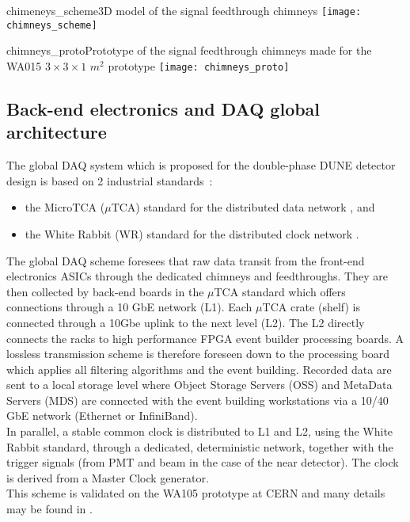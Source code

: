 \begin{cdrfigure}{chimeneys_scheme}{3D model of the signal feedthrough chimneys}
\texttt{[image: chimneys\_scheme]}
\end{cdrfigure}


\begin{cdrfigure}{chimneys_proto}{Prototype of the signal feedthrough chimneys made for the WA015 $3\times3\times 1$ $m^2$ prototype}
\texttt{[image: chimneys\_proto]}
\end{cdrfigure}

\subsection{Back-end electronics and DAQ global architecture}

The global DAQ system which is proposed for the double-phase DUNE detector design is based on 2 industrial standards~:

\begin{itemize}
\item the MicroTCA ($\mu$TCA) standard for the distributed data network \cite{mTCA-standard}, and
\item the White Rabbit (WR) standard for the distributed clock network \cite{WR-standard}.
\end{itemize}

The global DAQ scheme foresees that raw data transit from the front-end electronics ASICs through the dedicated chimneys and feedthroughs. They are then collected by back-end boards in the $\mu$TCA standard which offers connections through a 10 GbE network (L1). Each $\mu$TCA crate (shelf) is connected through a 10Gbe uplink to the next level (L2). The L2 directly connects the racks to high performance FPGA event builder processing boards. A lossless transmission scheme is therefore foreseen down to the processing board which applies all filtering algorithms and the event building. Recorded data are sent to a local storage level where Object Storage Servers (OSS) and MetaData Servers (MDS) are connected with the event building workstations via a 10/40 GbE network (Ethernet or InfiniBand).\\ 

In parallel, a stable common clock is distributed to L1 and L2, using the White Rabbit standard, through a dedicated, deterministic network, together with the trigger signals (from PMT and beam in the case of the near detector). The clock is derived from a Master Clock generator.\\
This scheme is validated on the WA105 prototype at CERN and many details may be found in \cite{TDR-WA105}.  

